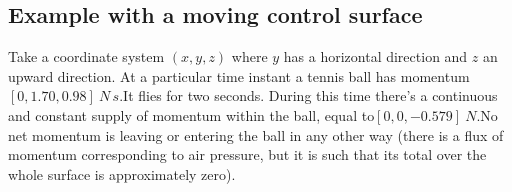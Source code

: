 \documentclass[a4paper,12pt,%
onecolumn,oneside,titlepage,%
british%
]{memoir}
\renewcommand*{\|}[1][]{\nonscript\:#1\vert\nonscript\:\mathopen{}}
\begin{document}
\subsection{Example with a moving control surface}
\label{sec:example_balance_vect}

Take a coordinate system $(x,y,z)$ where $y$ has a horizontal direction and $z$ an upward direction. At a particular time instant a tennis ball has momentum\enspace$[0,\num{1.70},\num{0.98}]\:\unit{N\,s}$.\enspace It flies for two seconds.
%
During this time there's a continuous and constant supply of momentum within the ball, equal to\enspace$[0,0,-\num{0.579}]\:\unit{N}$.\enspace No net momentum is leaving or entering the ball in any other way (there is a flux of momentum corresponding to air pressure, but it is such that its total over the whole surface is approximately zero).
\end{document}
